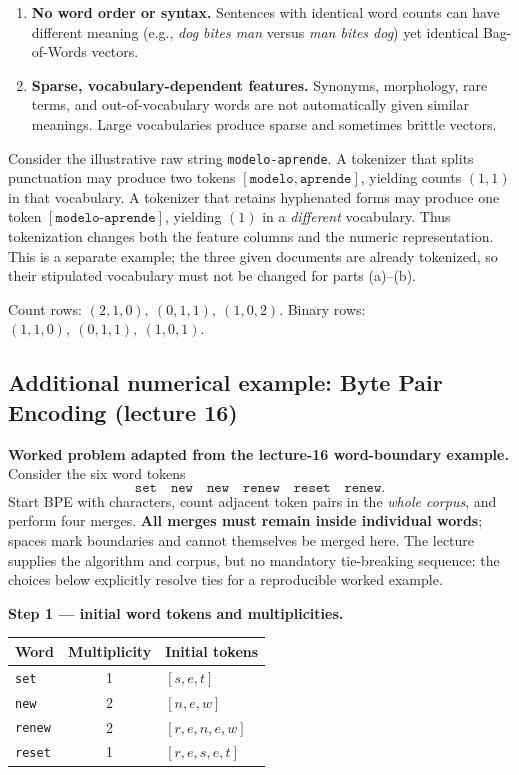 \begin{enumerate}
\item \textbf{No word order or syntax.} Sentences with identical word counts can have different meaning (e.g., \emph{dog bites man} versus \emph{man bites dog}) yet identical Bag-of-Words vectors.
\item \textbf{Sparse, vocabulary-dependent features.} Synonyms, morphology, rare terms, and out-of-vocabulary words are not automatically given similar meanings. Large vocabularies produce sparse and sometimes brittle vectors.
\end{enumerate}

Consider the illustrative raw string \texttt{modelo-aprende}. A tokenizer that splits punctuation may produce two tokens $[\texttt{modelo},\texttt{aprende}]$, yielding counts $(1,1)$ in that vocabulary. A tokenizer that retains hyphenated forms may produce one token $[\texttt{modelo-aprende}]$, yielding $(1)$ in a \emph{different} vocabulary. Thus tokenization changes both the feature columns and the numeric representation. This is a separate example; the three given documents are already tokenized, so their stipulated vocabulary must not be changed for parts (a)--(b).
\begin{answer}
Count rows: $\boxed{(2,1,0),\ (0,1,1),\ (1,0,2)}$. Binary rows: $\boxed{(1,1,0),\ (0,1,1),\ (1,0,1)}$.
\end{answer}

\subsection*{Additional numerical example: Byte Pair Encoding (lecture 16)}
\textbf{Worked problem adapted from the lecture-16 word-boundary example.} Consider the six word tokens
\[
\texttt{set}\quad\texttt{new}\quad\texttt{new}\quad\texttt{renew}\quad\texttt{reset}\quad\texttt{renew}.
\]
Start BPE with characters, count adjacent token pairs in the \emph{whole corpus}, and perform four merges. \textbf{All merges must remain inside individual words}; spaces mark boundaries and cannot themselves be merged here. The lecture supplies the algorithm and corpus, but no mandatory tie-breaking sequence: the choices below explicitly resolve ties for a reproducible worked example.

\textbf{Step 1 --- initial word tokens and multiplicities.}
\begin{center}\small
\begin{tabular}{@{}lcl@{}}\toprule Word & Multiplicity & Initial tokens\\\midrule
\texttt{set}&1&$[s,e,t]$\\
\texttt{new}&2&$[n,e,w]$\\
\texttt{renew}&2&$[r,e,n,e,w]$\\
\texttt{reset}&1&$[r,e,s,e,t]$\\\bottomrule
\end{tabular}\end{center}

